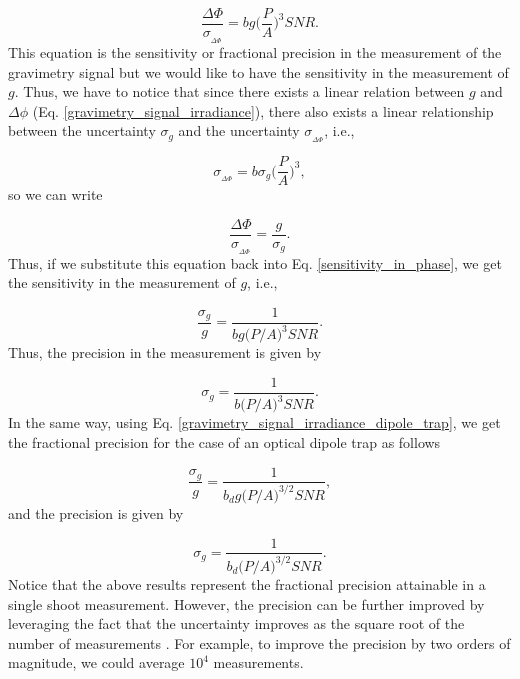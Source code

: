 \documentclass{article}
\begin{document}
\begin{equation}\label{sensitivity_in_phase}
    \frac{\Delta \Phi}{\sigma_{_{\Delta \Phi}}} = b g \bigg(\frac{P}{A}\bigg)^3 SNR.
\end{equation}
%
This equation is the sensitivity or fractional precision in the measurement of the gravimetry signal but we would like to have the sensitivity in the measurement of $g$. Thus, we have to notice that since there exists a linear relation between $g$ and $\Delta \phi$ (Eq. \ref{gravimetry_signal_irradiance}), there also exists a linear relationship between the uncertainty $\sigma_{g}$ and the uncertainty $\sigma_{_{\Delta \Phi}}$, i.e.,

\begin{equation}
    \sigma_{_{\Delta \Phi}} = b \sigma_{g} \bigg(\frac{P}{A}\bigg)^3,
\end{equation}
%
so we can write 

\begin{equation}
    \frac{\Delta \Phi}{\sigma_{_{\Delta \Phi}}} = \frac{g}{\sigma_{g}}.
\end{equation}
%
Thus, if we substitute this equation back into Eq. \ref{sensitivity_in_phase}, we get the sensitivity in the measurement of $g$, i.e.,

\begin{equation}\label{sensitivity_eq}
    \frac{\sigma_{g}}{g} = \frac{1}{b g \big(P/A\big)^3 SNR}.
\end{equation}
%
Thus, the precision in the measurement is given by

\begin{equation}\label{precision_eq}
    \sigma_{g} = \frac{1}{b \big(P/A\big)^3 SNR}.
\end{equation}
%
In the same way, using Eq. \ref{gravimetry_signal_irradiance_dipole_trap}, we get the fractional precision for the case of an optical dipole trap as follows

\begin{equation}\label{sensitivity_eq_dipole}
    \frac{\sigma_{g}}{g} = \frac{1}{b_{d} g \big(P/A\big)^{3/2} SNR},
\end{equation}
%
and the precision is given by

\begin{equation}
    \sigma_{g} = \frac{1}{b_{d} \big(P/A\big)^{3/2} SNR}.
\end{equation}
%
Notice that the above results represent the fractional precision attainable in a single shoot measurement. However, the precision can be further improved by leveraging the fact that the uncertainty improves as the square root of the number of measurements \cite{Bevington_Robinson_Blair_Mallinckrodt_McKay_1993}. For example, to improve the precision by two orders of magnitude, we could average $10^{4}$ measurements.
\end{document}
